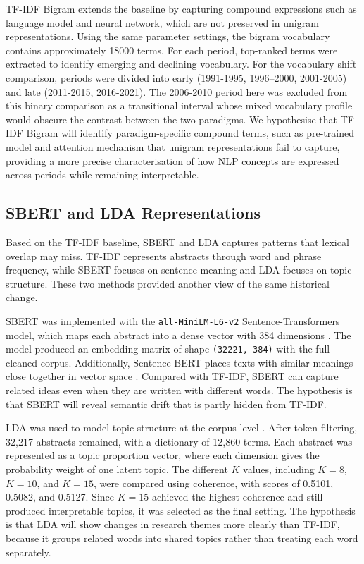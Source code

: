 TF-IDF Bigram extends the baseline by capturing compound expressions such as language model and neural network, which are not preserved in unigram representations. Using the same parameter settings, the bigram vocabulary contains approximately 18000 terms. For each period, top-ranked terms were extracted to identify emerging and declining vocabulary. For the vocabulary shift comparison, periods were divided into early (1991-1995, 1996--2000, 2001-2005) and late (2011-2015, 2016-2021). The 2006-2010 period here was excluded from this binary comparison as a transitional interval whose mixed vocabulary profile would obscure the contrast between the two paradigms. We hypothesise that TF-IDF Bigram will identify paradigm-specific compound terms, such as pre-trained model and attention mechanism that unigram representations fail to capture, providing a more precise characterisation of how NLP concepts are expressed across periods while remaining interpretable.





\subsection{SBERT and LDA Representations}

Based on the TF-IDF baseline, SBERT and LDA captures patterns that lexical overlap may miss. TF-IDF represents abstracts through word and phrase frequency, while SBERT focuses on sentence meaning and LDA focuses on topic structure. These two methods provided another view of the same historical change.

SBERT was implemented with the \texttt{all-MiniLM-L6-v2} Sentence-Transformers model, which maps each abstract into a dense vector with 384 dimensions \citep{allminilm_modelcard}. The model produced an embedding matrix of shape \texttt{(32221, 384)} with the full cleaned corpus. Additionally, Sentence-BERT places texts with similar meanings close together in vector space \citep{reimers2019sentence}. Compared with TF-IDF, SBERT can capture related ideas even when they are written with different words. The hypothesis is that SBERT will reveal semantic drift that is partly hidden from TF-IDF.

LDA was used to model topic structure at the corpus level \citep{blei2003latent}. After token filtering, 32,217 abstracts remained, with a dictionary of 12,860 terms. Each abstract was represented as a topic proportion vector, where each dimension gives the probability weight of one latent topic. The different $K$ values, including $K=8$, $K=10$, and $K=15$, were compared using coherence, with scores of 0.5101, 0.5082, and 0.5127. Since $K=15$ achieved the highest coherence and still produced interpretable topics, it was selected as the final setting. The hypothesis is that LDA will show changes in research themes more clearly than TF-IDF, because it groups related words into shared topics rather than treating each word separately.

